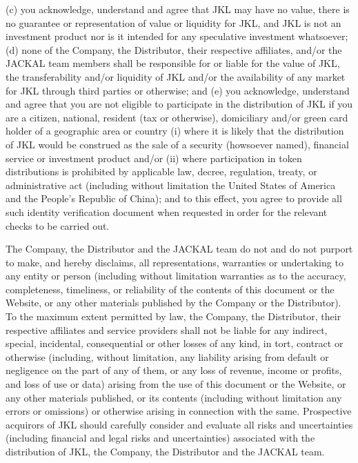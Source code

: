 \documentclass[11pt, nofootinbib]{article}
\begin{document}
{(c) you acknowledge, understand and agree that JKL may have no value, there is no guarantee or representation of value or liquidity for JKL, and JKL is not an investment
product nor is it intended for any speculative investment whatsoever;\newline\newline
(d) none of the Company, the Distributor, their respective affiliates, and/or the JACKAL team members shall be responsible for or liable for the value of JKL, the transferability
and/or liquidity of JKL and/or the availability of any market for JKL through third parties or otherwise; and \newline\newline
(e) you acknowledge, understand and agree that you are not eligible to participate in the distribution of JKL if you are a citizen, national, resident (tax or otherwise), domiciliary
and/or green card holder of a geographic area or country (i) where it is likely that the distribution of JKL would be construed as the sale of a security (howsoever named),
financial service or investment product and/or (ii) where participation in token distributions is prohibited by applicable law, decree, regulation, treaty, or administrative act
(including without limitation the United States of America and the People's Republic of China); and to this effect, you agree to provide all such identity verification document
when requested in order for the relevant checks to be carried out.\newline\newline

The Company, the Distributor and the JACKAL team do not and do not purport to make, and hereby disclaims, all representations, warranties or undertaking to any entity or
person (including without limitation warranties as to the accuracy, completeness, timeliness, or reliability of the contents of this document or the Website, or any other
materials published by the Company or the Distributor). To the maximum extent permitted by law, the Company, the Distributor, their respective affiliates and service providers
shall not be liable for any indirect, special, incidental, consequential or other losses of any kind, in tort, contract or otherwise (including, without limitation, any liability arising
from default or negligence on the part of any of them, or any loss of revenue, income or profits, and loss of use or data) arising from the use of this document or the Website,
or any other materials published, or its contents (including without limitation any errors or omissions) or otherwise arising in connection with the same. Prospective acquirors of
JKL should carefully consider and evaluate all risks and uncertainties (including financial and legal risks and uncertainties) associated with the distribution of JKL, the
Company, the Distributor and the JACKAL team.\newline\newline

}
\end{document}
